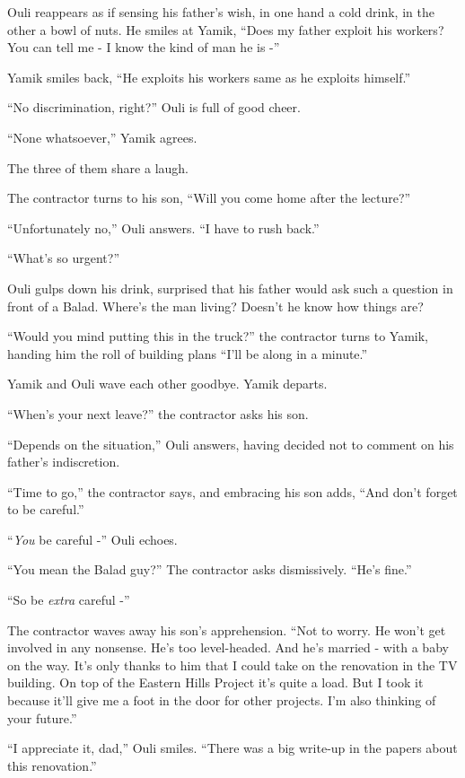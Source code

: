 \documentclass[twoside,11pt]{book}
\begin{document}
Ouli reappears as if sensing his father's wish, in one hand a cold drink, in the other a bowl of nuts. He smiles at
Yamik, ``Does my father exploit his workers? You can tell me - I know the kind of man he is
-''

Yamik smiles back, ``He exploits his workers same as he exploits himself.''

``No discrimination, right?'' Ouli is full of good cheer.

``None whatsoever,'' Yamik agrees.

The three of them share a laugh.

The contractor turns to his son, ``Will you come home after the lecture?''

``Unfortunately no,'' Ouli answers. ``I have to rush back.''

``What's so urgent?''

Ouli gulps down his drink, surprised that his father would ask such a question in front of a Balad. Where's the man
living? Doesn't he know how things are? \

``Would you mind putting this in the truck?'' the contractor turns to Yamik, handing him the roll of building plans
``I'll be along in a minute.''

Yamik and Ouli wave each other goodbye. Yamik departs.

``When's your next leave?'' the contractor asks his son.

``Depends on the situation,'' Ouli answers, having decided not to comment on his father's
indiscretion.

``Time to go,'' the contractor says, and embracing his son adds, ``And don't
forget to be careful.''

``\textit{You} be careful -'' Ouli echoes.

``You mean the Balad guy?'' The contractor asks dismissively. ``He's
fine.''

``So be \textit{extra} careful -''

The contractor waves away his son's apprehension.  ``Not to worry. He won't get involved in any nonsense.
He's too level-headed. And he's married - with a baby on the way. It's only thanks to him that I could take on the
renovation in the TV building. On top of the Eastern Hills Project it's quite a load. But I took it because it'll give
me a foot in the door for other projects. I'm also thinking of your future.''

``I appreciate it, dad,'' Ouli smiles. ``There was a big write-up in the papers
about this renovation.''
\end{document}
